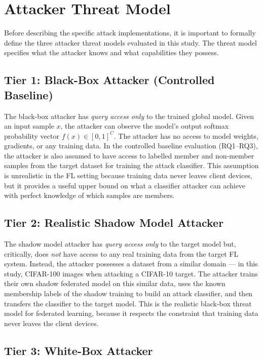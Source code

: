 \documentclass[12pt, a4paper]{report}
\begin{document}
\section{Attacker Threat Model}

Before describing the specific attack implementations, it is important to formally
define the three attacker threat models evaluated in this study. The threat model
specifies what the attacker knows and what capabilities they possess.

\subsection{Tier 1: Black-Box Attacker (Controlled Baseline)}

The black-box attacker has \textit{query access only} to the trained global model.
Given an input sample $x$, the attacker can observe the model's output softmax
probability vector $f(x) \in [0,1]^C$. The attacker has no access to model
weights, gradients, or any training data. In the controlled baseline evaluation
(RQ1--RQ3), the attacker is also assumed to have access to labelled member and
non-member samples from the target dataset for training the attack classifier.
This assumption is unrealistic in the FL setting because training data never leaves
client devices, but it provides a useful upper bound on what a classifier attacker
can achieve with perfect knowledge of which samples are members.

\subsection{Tier 2: Realistic Shadow Model Attacker}

The shadow model attacker has \textit{query access only} to the target model but,
critically, does \textit{not} have access to any real training data from the target
FL system. Instead, the attacker possesses a dataset from a similar domain ---
in this study, CIFAR-100 images when attacking a CIFAR-10 target. The attacker
trains their own shadow federated model on this similar data, uses the known
membership labels of the shadow training to build an attack classifier, and then
transfers the classifier to the target model. This is the realistic black-box
threat model for federated learning, because it respects the constraint that
training data never leaves the client devices.

\subsection{Tier 3: White-Box Attacker}
\end{document}
